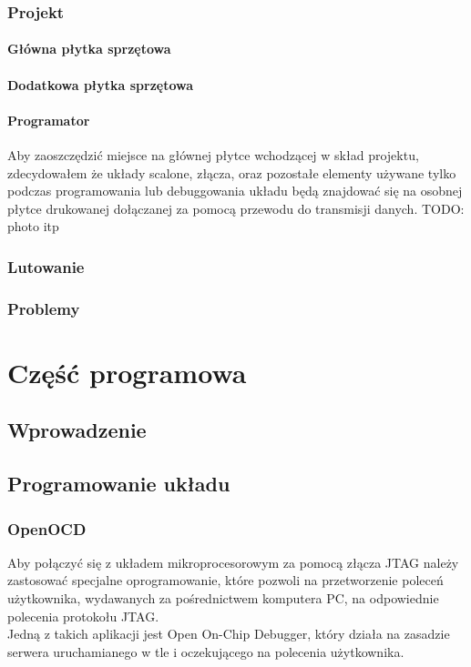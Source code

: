 \documentclass[a4paper,12pt]{book}
\begin{document}
			\subsection{Projekt}
				\subsubsection{Główna płytka sprzętowa}
				\subsubsection{Dodatkowa płytka sprzętowa}
				\subsubsection{Programator}
					\label{sec:programator}
					Aby zaoszczędzić miejsce na głównej płytce wchodzącej w skład projektu, zdecydowałem że układy scalone, złącza, oraz pozostałe elementy używane tylko podczas programowania lub debuggowania układu będą znajdować się na osobnej płytce drukowanej dołączanej za pomocą przewodu do transmisji danych. TODO: photo itp
			\subsection{Lutowanie}
			\subsection{Problemy}






	\chapter{Część programowa}
		\section{Wprowadzenie}
		\section{Programowanie układu}
		
			\subsection{OpenOCD}
				Aby połączyć się z układem mikroprocesorowym za pomocą złącza JTAG należy zastosować specjalne oprogramowanie, które pozwoli na przetworzenie poleceń użytkownika, wydawanych za pośrednictwem komputera PC, na odpowiednie polecenia protokołu JTAG.\\
				Jedną z takich aplikacji jest Open On-Chip Debugger\cite{openocd}, który działa na zasadzie serwera uruchamianego w tle i oczekującego na polecenia użytkownika.
\end{document}
